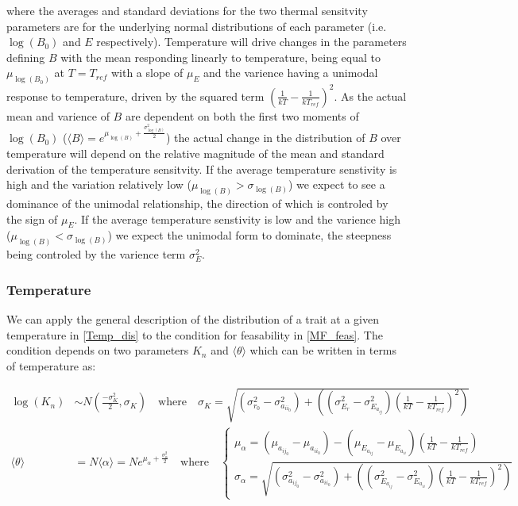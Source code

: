 \documentclass{article}
\begin{document}
where the averages and standard deviations for the two thermal sensitvity parameters are for the underlying normal distributions of each parameter (i.e. $\log(B_0)$ and $E$ respectively). Temperature will drive changes in the parameters defining $B$ with the mean responding linearly to temperature, being equal to $\mu_{\log(B_0)}$ at $T = T_{ref}$ with a slope of $\mu_E$ and the varience having a unimodal response to temperature, driven by the squared term $\left(\frac{1}{kT} - \frac{1}{kT_{ref}} \right)^2$. As the actual mean and varience of $B$ are dependent on both the first two moments of $\log(B_0)$ ($\langle B \rangle = e^{\mu_{\log(B)} + \frac{\sigma_{\log(B)}^2}{2} }$)  the actual change in the distribution of $B$ over temperature will depend on the relative magnitude of the mean and standard derivation of the temperature sensitvity. If the average temperature senstivity is high and the variation relatively low ($\mu_{\log(B)} > \sigma_{\log(B)}$) we expect to see a dominance of the unimodal relationship, the direction of which is controled by the sign of $\mu_E$. If the average temperature senstivity is low and the varience high ($\mu_{\log(B)} < \sigma_{\log(B)}$) we expect the unimodal form to dominate, the steepness being controled by the varience term $\sigma_E^2$.

\subsubsection{Temperature}
We can apply the general description of the distribution of a trait at a given temperature in \cref{Temp_dis} to the condition for feasability in \cref{MF_feas}. The condition depends on two parameters $K_n$ and $\langle \theta \rangle$ which can be written in terms of temperature as:

\begin{align}
  \log(K_n) &\sim N(\frac{-\sigma_{K}^2}{2}, \sigma_{K})
   \quad \text{where} \quad \sigma_{K} =
   \sqrt{\left(\sigma_{r_0}^2 - \sigma_{a_{ii}_0}^2 \right) + \left( \left(\sigma_{E_r}^2 - \sigma_{E_{a_{ij}}}^2\right) \left(\frac{1}{kT} - \frac{1}{k T_{ref}} \right)^2 \right)} \label{Knorm_DT}
   \\
  \langle \theta \rangle &= N \langle \alpha \rangle = N e^{ \mu_{\alpha} + \frac{\sigma_{\alpha}^2}{2} }
  \quad \text{where} \quad
  \begin{cases}
    \mu_{\alpha}  = \left( \mu_{a_{ij}_0} - \mu_{a_{ii}_0} \right) -
                    \left( \mu_{E_{a_{ij}}} - \mu_{E_{a_{ii}}} \right)
                    \left(\frac{1}{kT} - \frac{1}{k T_{ref}} \right)
    \\
    \sigma_{\alpha} =  \sqrt{\left(\sigma_{a_{ij}_0}^2 - \sigma_{a_{ii}_0}^2 \right) + \left( \left(\sigma_{E_{a_{ij}}}^2 - \sigma_{E_{a_{ii}}}^2\right) \left(\frac{1}{kT} - \frac{1}{k T_{ref}} \right)^2 \right)}
  \end{cases} \label{theta_DT}
\end{align}
\end{document}
